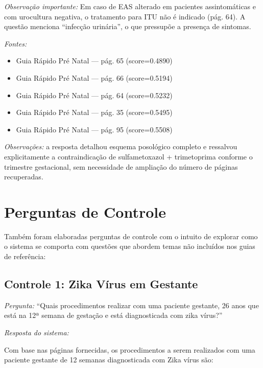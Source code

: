 \documentclass[conference,a4paper]{IEEEtran}
\begin{document}
\textit{Observação importante:} Em caso de EAS alterado em
pacientes assintomáticas e com urocultura negativa, o tratamento
para ITU não é indicado (pág. 64). A questão menciona ``infecção
urinária'', o que pressupõe a presença de sintomas.

\textit{Fontes:}
\begin{itemize}
  \item {Guia Rápido Pré Natal} --- pág. 65 (score=0.4890)
  \item {Guia Rápido Pré Natal} --- pág. 66 (score=0.5194)
  \item {Guia Rápido Pré Natal} --- pág. 64 (score=0.5232)
  \item {Guia Rápido Pré Natal} --- pág. 35 (score=0.5495)
  \item {Guia Rápido Pré Natal} --- pág. 95 (score=0.5508)
\end{itemize}

\medskip
\noindent\textit{Observações:} a resposta detalhou esquema
posológico completo e ressalvou explicitamente a contraindicação
de sulfametoxazol + trimetoprima conforme o trimestre gestacional,
sem necessidade de ampliação do número de páginas recuperadas.

\section{Perguntas de Controle}
\label{sec:resultados}

Também foram elaboradas perguntas de controle com o intuito de explorar como o sistema se comporta com questões que abordem temas não incluídos nos guias de referência:

\subsection{Controle 1: Zika Vírus em Gestante}

\noindent\textit{Pergunta:} ``Quais procedimentos realizar com
uma paciente gestante, 26 anos que está na 12ª semana de gestação
e está diagnosticada com zika vírus?''

\medskip
\noindent\textit{Resposta do sistema:}

Com base nas páginas fornecidas, os procedimentos a serem
realizados com uma paciente gestante de 12 semanas diagnosticada
com Zika vírus são:
\end{document}
